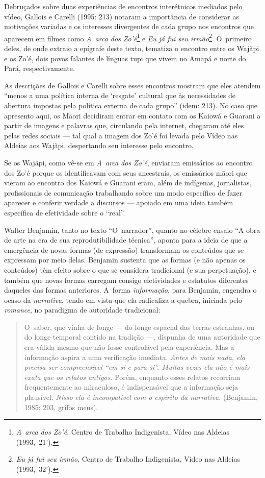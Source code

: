 Debruçados sobre duas experiências de encontros interétnicos mediados
pelo vídeo, Gallois e Carelli (1995: 213) notaram a importância de
considerar as motivações variadas e os interesses divergentes de cada
grupo nos encontros que aparecem em filmes como \emph{A~arca dos
Zo’é}\footnote[9]{\emph{A~arca dos Zo’é}, Centro de Trabalho Indigenista, Vídeo
nas Aldeias (1993,~21’).} e \emph{Eu já fui seu irmão}\footnote[10]{\emph{Eu já fui seu
irmão}, Centro de Trabalho Indigenista, Vídeo nas Aldeias (1993,~32’).}.
O~primeiro deles, de onde extraio a epígrafe deste texto, tematiza o
encontro entre os Wajãpi e os Zo’é, dois povos falantes de línguas tupi
que vivem no Amapá e norte do Pará, respectivamente.

As descrições de Gallois e Carelli sobre esses encontros mostram que
eles atendem ``menos a uma política interna de `resgate' cultural que às
necessidades de abertura impostas pela política externa de cada grupo''
(idem: 213). No caso que apresento aqui, os M\=aori decidiram entrar em
contato com os Kaiowá e Guarani a partir de imagens e palavras que,
circulando pela internet, chegaram até eles pelas redes sociais --- tal
qual a imagem dos Zo’é foi levada pelo Vídeo nas Aldeias aos Wajãpi,
despertando seu interesse pelo encontro.

Se os Wajãpi, como vê-se em \emph{A~arca dos Zo’é}, enviaram emissários ao
encontro dos Zo’é porque os identificavam com seus ancestrais, os
emissários m\=aori que vieram ao encontro dos Kaiowá e Guarani eram,
além de indígenas, jornalistas, profissionais de comunicação
trabalhando sobre um modo específico de fazer aparecer e conferir
verdade a discursos --- apoiado em uma ideia também específica de
efetividade sobre o ``real''.

Walter Benjamin, tanto no texto ``O~narrador'', quanto no célebre ensaio ``A
obra de arte na era de sua reprodutibilidade técnica'', aponta para a
ideia de que a emergência de novas formas (de expressão) transformam os
conteúdos que se expressam por meio delas. Benjamin sustenta que as
formas (e não apenas os conteúdos) têm efeito sobre o que se considera
tradicional (e sua perpetuação), e também que novas formas carregam
consigo efetividades e estatutos diferentes daqueles das formas
anteriores. A~forma \emph{informação}, para Benjamin, engendra o ocaso da
\emph{narrativa}, tendo em vista que ela radicaliza a quebra, iniciada pelo
\emph{romance}, no paradigma de autoridade tradicional:

\begin{quote}
O~saber, que vinha de longe --- do longe espacial das terras estranhas,
ou do longe temporal contido na tradição ---, dispunha de uma autoridade
que era válida mesmo que não fosse controlável pela experiência. Mas a
informação aspira a uma verificação imediata. \emph{Antes de mais nada,
ela precisa ser compreensível ``em si e para si''. Muitas vezes ela não
é mais exata que os relatos antigos.} Porém, enquanto esses relatos
recorriam frequentemente ao miraculoso, é indispensável que a informação
seja plausível. \emph{Nisso ela é incompatível com o espírito da
narrativa.} (Benjamin, 1985: 203, grifos meus).
\end{quote}

